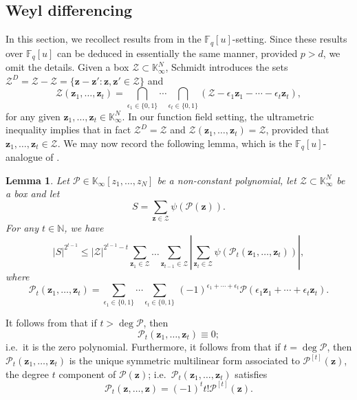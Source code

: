 \documentclass[12pt, reqno]{amsart}
\numberwithin{equation}{section}
\newcommand{\0}{\mathbf{0}}
\newcommand{\FF}{\mathbb{F}}
\newcommand{\NN}{\mathbb{N}}
\newcommand{\KK}{\mathbb{K}}
\renewcommand{\leq}{\leqslant}
\newcommand{\z}{\mathbf{z}}
\renewcommand{\=}{\equiv}
\newcommand{\1}{\mathbf{1}}
\newtheorem{lemma}[theorem]{Lemma}
\theoremstyle{definition}
\begin{document}
\subsection*{Weyl differencing}
In this section, we recollect results from \cite[Sect.~11]{S} in the $\FF_q[u]$-setting. Since these results
over $\FF_q[u]$ can be deduced in essentially the same manner, provided $p > d$, we omit the details.
Given a box $\mathcal{Z} \subset \mathbb{K}_\infty^{N}$, Schmidt introduces the 
sets  $\mathcal{Z}^D = \mathcal{Z} - \mathcal{Z} = \{ \mathbf{z} - \mathbf{z}' : \mathbf{z}, \mathbf{z}' \in \mathcal{Z} \}$ and 
$$
\mathcal{Z} (\mathbf{z}_1, \ldots, \mathbf{z}_t) = \bigcap_{\epsilon_1 \in \{0, 1\} } \cdots \bigcap_{\epsilon_t \in \{0, 1\} }
(\mathcal{Z} - \epsilon_1 \mathbf{z}_1 - \cdots - \epsilon_t \mathbf{z}_t),
$$
for any given  $\mathbf{z}_1, \ldots, \mathbf{z}_t \in \mathbb{K}_\infty^{N}$. 
In our function field setting, the ultrametric inequality implies that in fact 
$
\mathcal{Z}^D = \mathcal{Z}$ and
$\mathcal{Z}(\mathbf{z}_1, \ldots, \mathbf{z}_{t})  = \mathcal{Z}$, provided that 
$\mathbf{z}_1, \ldots, \mathbf{z}_{t}\in \mathcal{Z}$.
We may now record the  following lemma, which is the $\FF_q[u]$-analogue of \cite[Lemma~11.1]{S}.

\begin{lemma}
\label{Diff}
Let $\mathcal{P} \in \KK_{\infty} [z_1, \dots, z_N]$ be a non-constant polynomial,
let $\mathcal{Z}\subset \KK_\infty^N$ be a box and let 
$$
S = \sum_{ \z \in \mathcal{Z} } \psi(  \mathcal{P} (\z)  ).
$$
For any  $t \in \NN$, we have 
$$
|S|^{2^{t-1}} \leq   |\mathcal{Z}|^{2^{t-1} - t} \sum_{ \z_1 \in \mathcal{Z}} \dots  \sum_{ \z_{t-1} \in \mathcal{Z}}
\left|  \sum_{ \z_{t} \in \mathcal{Z}}   \psi(  \mathcal{P}_t(\z_1, \ldots, \z_t ) )    \right|,
$$
where 
$$
\mathcal{P}_{t}(\z_1, \ldots, \z_{t}) = \sum_{\epsilon_1 \in \{0, 1\} } \cdots \sum_{\epsilon_{t} \in \{0, 1\} } \,
(-1)^{\epsilon_1 + \cdots + \epsilon_{t} }
\mathcal{P}( \epsilon_1 \z_1 + \cdots + \epsilon_{t} \z_{t} ).
$$
\end{lemma}

It follows from \cite[Lemma 11.2(a)]{S} that if $t > \deg \mathcal{P}$, then
\begin{equation}
\label{ZERO}
\mathcal{P}_t( \z_1, \ldots, \z_{t} ) \equiv 0;
\end{equation}
i.e.\ it is the zero polynomial. Furthermore, it follows from \cite[Lemma 11.4(A)]{S} that if $t = \deg \mathcal{P}$,
then $\mathcal{P}_{t} (\z_1, \ldots, \z_{t})$ is the unique symmetric multilinear form associated to $\mathcal{P}^{[t]}(\z)$, the degree $t$ component of $\mathcal{P}(\z)$; i.e.\
$\mathcal{P}_{t} (\z_1, \ldots, \z_{t})$  satisfies
\begin{equation}
\label{symmm}
\mathcal{P}_{t}(\mathbf{z}, \ldots, \mathbf{z}) = (-1)^{t}   t!  \mathcal{P}^{[t]} (\mathbf{z}).
\end{equation}
\end{document}
